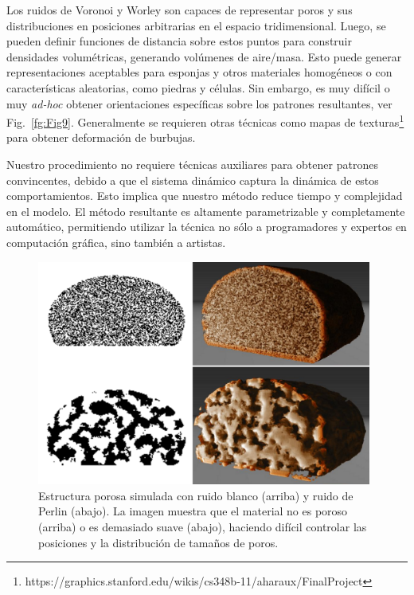 Los ruidos de Voronoi y Worley son capaces de representar poros y sus distribuciones en posiciones arbitrarias en el espacio tridimensional.
Luego, se pueden definir funciones de distancia sobre estos puntos para construir densidades volumétricas, generando volúmenes de aire/masa.
Esto puede generar representaciones aceptables para esponjas y otros materiales homogéneos o con características aleatorias, como piedras y células.
Sin embargo, es muy difícil o muy {\em ad-hoc} obtener orientaciones específicas sobre los patrones resultantes, ver Fig.~\ref{fg:Fig9}.
Generalmente se requieren otras técnicas como mapas de texturas\footnote{https://graphics.stanford.edu/wikis/cs348b-11/aharaux/FinalProject} para obtener deformación de burbujas.

Nuestro procedimiento no requiere técnicas auxiliares para obtener patrones convincentes, debido a que el sistema dinámico captura la dinámica de estos comportamientos.
Esto implica que nuestro método reduce tiempo y complejidad en el modelo.
El método resultante es altamente parametrizable y completamente automático, permitiendo utilizar la técnica no sólo a programadores y expertos en computación gráfica, sino también a artistas.


\begin{figure}
  \centerline{\includegraphics[width=11cm]{figures/Fig8}}
  \caption{Estructura porosa simulada con ruido blanco (arriba) y ruido de Perlin (abajo). La imagen muestra que el material no es poroso (arriba) o es demasiado suave (abajo), haciendo difícil controlar las posiciones y la distribución de tamaños de poros.}
  \label{fg:Fig8}
\end{figure}

\clearpage

